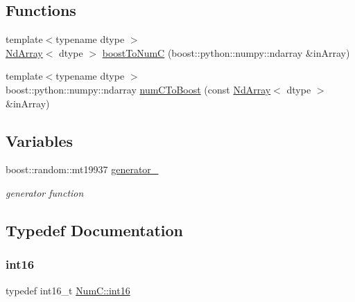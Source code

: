 \subsection*{Functions}
\begin{DoxyCompactItemize}
\item 
{\footnotesize template$<$typename dtype $>$ }\\\mbox{\hyperlink{class_num_c_1_1_nd_array}{Nd\+Array}}$<$ dtype $>$ \mbox{\hyperlink{namespace_num_c_ae4b807d81054b18034f455e5ead76711}{boost\+To\+NumC}} (boost\+::python\+::numpy\+::ndarray \&in\+Array)
\item 
{\footnotesize template$<$typename dtype $>$ }\\boost\+::python\+::numpy\+::ndarray \mbox{\hyperlink{namespace_num_c_a40a56236fea76d55726c915c1415ab67}{num\+C\+To\+Boost}} (const \mbox{\hyperlink{class_num_c_1_1_nd_array}{Nd\+Array}}$<$ dtype $>$ \&in\+Array)
\end{DoxyCompactItemize}
\subsection*{Variables}
\begin{DoxyCompactItemize}
\item 
boost\+::random\+::mt19937 \mbox{\hyperlink{namespace_num_c_af78b9b391c2e4523f13bb00706b21b02}{generator\+\_\+}}
\begin{DoxyCompactList}\small\item\em generator function \end{DoxyCompactList}\end{DoxyCompactItemize}


\subsection{Typedef Documentation}
\mbox{\label{namespace_num_c_a55b6140ac3972d03a7277fc227478dc2}} 
\subsubsection{\texorpdfstring{int16}{int16}}
{\footnotesize\ttfamily typedef int16\+\_\+t \mbox{\hyperlink{namespace_num_c_a55b6140ac3972d03a7277fc227478dc2}{Num\+C\+::int16}}}

\mbox{\label{namespace_num_c_aa5a7e69266097d55816d4cdb19542b53}} 
